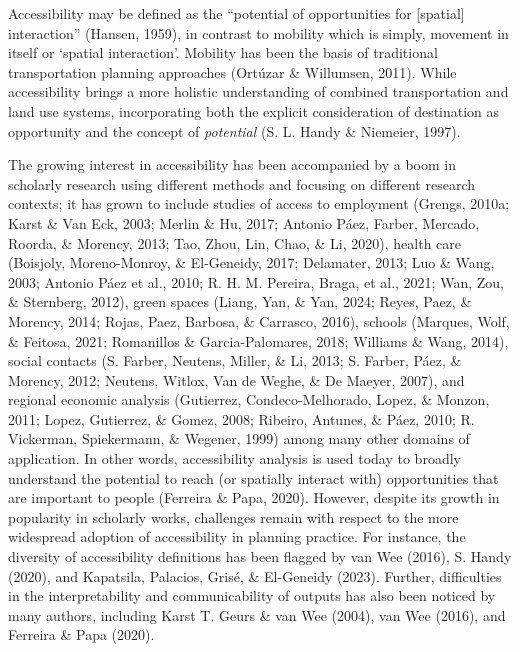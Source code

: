 \documentclass[
11pt, %
oneside, %
english, %
singlespacing, %
]{macthesis} %
\begin{document}
Accessibility may be defined as the ``potential of opportunities for {[}spatial{]} interaction'' (Hansen, 1959), in contrast to mobility which is simply, movement in itself or `spatial interaction'. Mobility has been the basis of traditional transportation planning approaches (Ortúzar \& Willumsen, 2011). While accessibility brings a more holistic understanding of combined transportation and land use systems, incorporating both the explicit consideration of destination as opportunity and the concept of \emph{potential} (S. L. Handy \& Niemeier, 1997).

The growing interest in accessibility has been accompanied by a boom in scholarly research using different methods and focusing on different research contexts; it has grown to include studies of access to employment (Grengs, 2010a; Karst \& Van Eck, 2003; Merlin \& Hu, 2017; Antonio Páez, Farber, Mercado, Roorda, \& Morency, 2013; Tao, Zhou, Lin, Chao, \& Li, 2020), health care (Boisjoly, Moreno-Monroy, \& El-Geneidy, 2017; Delamater, 2013; Luo \& Wang, 2003; Antonio Páez et al., 2010; R. H. M. Pereira, Braga, et al., 2021; Wan, Zou, \& Sternberg, 2012), green spaces (Liang, Yan, \& Yan, 2024; Reyes, Paez, \& Morency, 2014; Rojas, Paez, Barbosa, \& Carrasco, 2016), schools (Marques, Wolf, \& Feitosa, 2021; Romanillos \& Garcia-Palomares, 2018; Williams \& Wang, 2014), social contacts (S. Farber, Neutens, Miller, \& Li, 2013; S. Farber, Páez, \& Morency, 2012; Neutens, Witlox, Van de Weghe, \& De Maeyer, 2007), and regional economic analysis (Gutierrez, Condeco-Melhorado, Lopez, \& Monzon, 2011; Lopez, Gutierrez, \& Gomez, 2008; Ribeiro, Antunes, \& Páez, 2010; R. Vickerman, Spiekermann, \& Wegener, 1999) among many other domains of application. In other words, accessibility analysis is used today to broadly understand the potential to reach (or spatially interact with) opportunities that are important to people (Ferreira \& Papa, 2020). However, despite its growth in popularity in scholarly works, challenges remain with respect to the more widespread adoption of accessibility in planning practice. For instance, the diversity of accessibility definitions has been flagged by van Wee (2016), S. Handy (2020), and Kapatsila, Palacios, Grisé, \& El-Geneidy (2023). Further, difficulties in the interpretability and communicability of outputs has also been noticed by many authors, including Karst T. Geurs \& van Wee (2004), van Wee (2016), and Ferreira \& Papa (2020).
\end{document}

